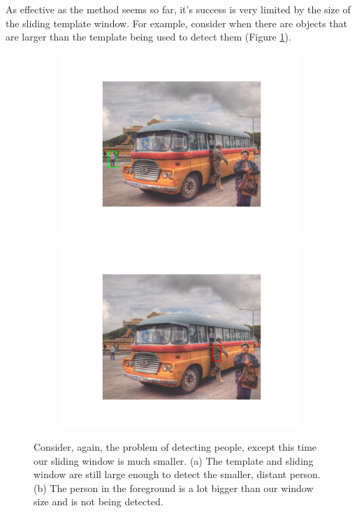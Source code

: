 \documentclass{article}
\begin{document}
As effective as the method seems so far, it's success is very limited by the size of the sliding template window. For example, consider when there are objects that are larger than the template being used to detect them (Figure \ref{fig:small_sliding_window}).

\begin{figure}[h]
  \begin{subfigure}{0.48\textwidth}
    \includegraphics[width=\linewidth]{small_sliding_window_a.jpg}
    \caption{}
  \end{subfigure}
  \hspace*{\fill} %
  \begin{subfigure}{0.48\textwidth}
    \includegraphics[width=\linewidth]{small_sliding_window_b.jpg}
    \caption{}
  \end{subfigure}
  \caption{Consider, again, the problem of detecting people, except this time our sliding window is much smaller. (a) The template and sliding window are still large enough to detect the smaller, distant person. (b) The person in the foreground is a lot bigger than our window size and is not being detected.}
  \label{fig:small_sliding_window}
\end{figure}
\end{document}
